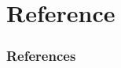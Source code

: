 \documentclass[UKenglish
  pdftex                    %
  dvipsnames                %
]{beamer}
\begin{document}
\section*{Reference}
\begin{frame}[allowframebreaks]
\frametitle{References}

\printbibliography

\end{frame}
\end{document}
